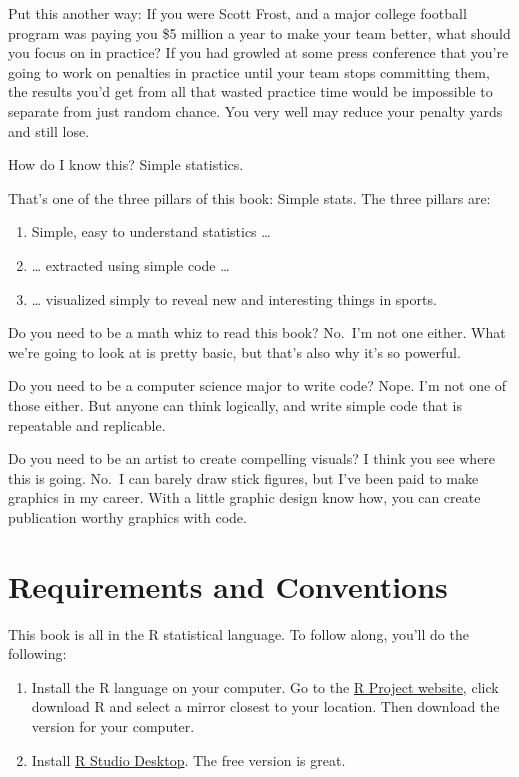\documentclass[
  letterpaper,
  DIV=11,
  numbers=noendperiod]{scrreprt}
\providecommand{\tightlist}{%
  \setlength{\itemsep}{0pt}\setlength{\parskip}{0pt}}\usepackage{longtable,booktabs,array}
\begin{document}
Put this another way: If you were Scott Frost, and a major college
football program was paying you \$5 million a year to make your team
better, what should you focus on in practice? If you had growled at some
press conference that you're going to work on penalties in practice
until your team stops committing them, the results you'd get from all
that wasted practice time would be impossible to separate from just
random chance. You very well may reduce your penalty yards and still
lose.

How do I know this? Simple statistics.

That's one of the three pillars of this book: Simple stats. The three
pillars are:

\begin{enumerate}
\def\labelenumi{\arabic{enumi}.}
\tightlist
\item
  Simple, easy to understand statistics \ldots{}
\item
  \ldots{} extracted using simple code \ldots{}
\item
  \ldots{} visualized simply to reveal new and interesting things in
  sports.
\end{enumerate}

Do you need to be a math whiz to read this book? No.~I'm not one either.
What we're going to look at is pretty basic, but that's also why it's so
powerful.

Do you need to be a computer science major to write code? Nope. I'm not
one of those either. But anyone can think logically, and write simple
code that is repeatable and replicable.

Do you need to be an artist to create compelling visuals? I think you
see where this is going. No.~I can barely draw stick figures, but I've
been paid to make graphics in my career. With a little graphic design
know how, you can create publication worthy graphics with code.

\hypertarget{requirements-and-conventions}{%
\section{Requirements and
Conventions}\label{requirements-and-conventions}}

This book is all in the R statistical language. To follow along, you'll
do the following:

\begin{enumerate}
\def\labelenumi{\arabic{enumi}.}
\item
  Install the R language on your computer. Go to the
  \href{https://www.r-project.org/}{R Project website}, click download R
  and select a mirror closest to your location. Then download the
  version for your computer.
\item
  Install \href{https://www.rstudio.com/products/rstudio/\#Desktop}{R
  Studio Desktop}. The free version is great.
\end{enumerate}
\end{document}
